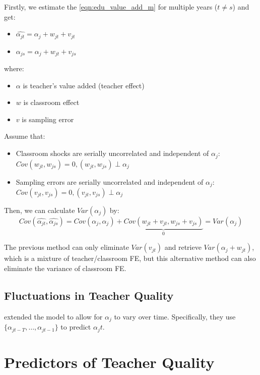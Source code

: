         Firstly, we estimate the \ref{eqn:edu_value_add_m} for multiple years ($t \neq s$) and get:
        \begin{itemize}
            \item $\widehat{\alpha_{jt}}=\alpha_j + w_{jt} + v_{jt}$
            \item $\widehat{\alpha_{js}}=\alpha_j + w_{jt} + v_{js}$
        \end{itemize}
        where:
        \begin{itemize}
            \item $\alpha$ is teacher's value added (teacher effect)
            \item $w$ is classroom effect
            \item $v$ is sampling error
        \end{itemize}
        Assume that:
        \begin{itemize}
            \item Classroom shocks are serially uncorrelated and independent of $\alpha_j$: $Cov(w_{jt},w_{js})=0, (w_{jt},w_{js})\perp \alpha_j$
            \item Sampling errors are serially uncorrelated and independent of $\alpha_j$: $Cov(v_{jt},v_{js})=0, (v_{jt},v_{js})\perp \alpha_j$
        \end{itemize}
        Then, we can calculate $Var(\alpha_j)$ by:
        $$Cov(\widehat{\alpha_{jt}},\widehat{\alpha_{js}}) = Cov(\alpha_j,\alpha_j) + \underbrace{Cov(w_{jt}+v_{jt},w_{js}+v_{js})}_{0} = Var(\alpha_j)$$

        The previous method can only eliminate $Var(v_{jt})$ and retrieve $Var(\alpha_j + w_{jt})$, which is a mixture of teacher/classroom FE, but this alternative method can also eliminate the variance of classroom FE.
        
    \subsection{Fluctuations in Teacher Quality}

        \cite{chetty_measuring_2014} extended the model to allow for $\alpha_j$ to vary over time. Specifically, they use $\{ \alpha_{jt-T},\dots,\alpha_{jt-1} \}$ to predict $\alpha_jt$.

\section{Predictors of Teacher Quality}

